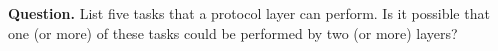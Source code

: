 \textbf{Question.} List five tasks that a protocol layer can
perform. Is it possible that one (or more) of these tasks could be
performed by two (or more) layers?
